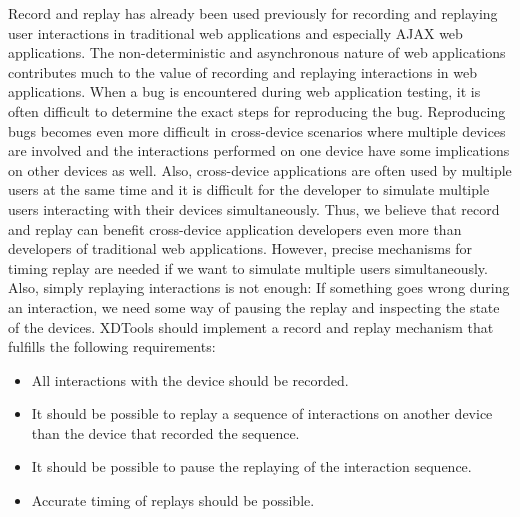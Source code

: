 Record and replay has already been used previously for recording and replaying user interactions in traditional web applications and especially AJAX web applications. The non-deterministic and asynchronous nature of web applications contributes much to the value of recording and replaying interactions in web applications. When a bug is encountered during web application testing, it is often difficult to determine the exact steps for reproducing the bug. Reproducing bugs becomes even more difficult in cross-device scenarios where multiple devices are involved and the interactions performed on one device have some implications on other devices as well. Also, cross-device applications are often used by multiple users at the same time and it is difficult for the developer to simulate multiple users interacting with their devices simultaneously. Thus, we believe that record and replay can benefit cross-device application developers even more than developers of traditional web applications. However, precise mechanisms for timing replay are needed if we want to simulate multiple users simultaneously. Also, simply replaying interactions is not enough: If something goes wrong during an interaction, we need some way of pausing the replay and inspecting the state of the devices. XDTools should implement a record and replay mechanism that fulfills the following requirements:
\begin{itemize}
	\item All interactions with the device should be recorded. 
	\item It should be possible to replay a sequence of interactions on another device than the device that recorded the sequence.
	\item It should be possible to pause the replaying of the interaction sequence.
	\item Accurate timing of replays should be possible.
\end{itemize}